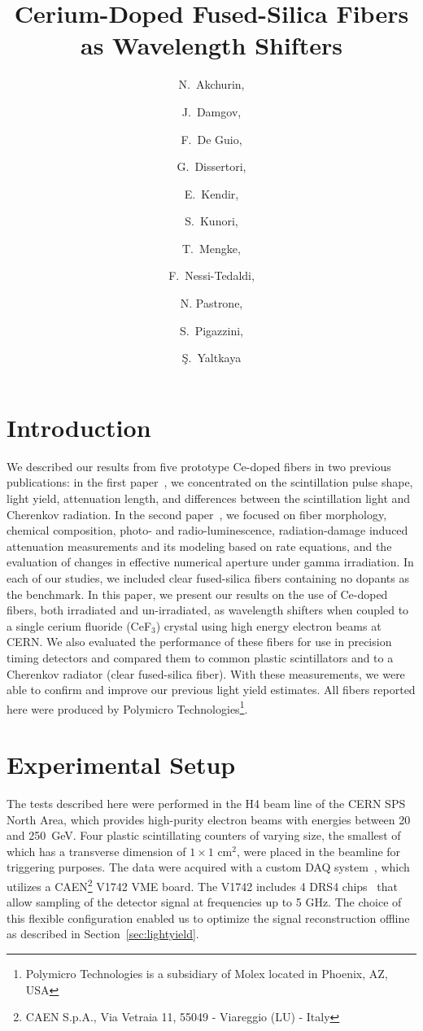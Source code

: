 \documentclass[a4paper,11pt]{article}
\title{\boldmath  Cerium-Doped Fused-Silica Fibers
as Wavelength Shifters}
\author[a,1]{N.~Akchurin,\note{Corresponding author.}}
\author[a]{J.~Damgov,}
\author[a]{F.~De Guio,}
\author[c]{G.~Dissertori,}
\author[b]{E.~Kendir,}
\author[a]{S.~Kunori,}
\author[a]{T.~Mengke,}
\author[c]{F.~Nessi-Tedaldi,}
\author[d]{N. Pastrone,}
\author[c]{S.~Pigazzini,}
\author[b]{\c{S}.~Yaltkaya}
\affiliation[a]{Texas Tech University, Department of Physics and Astronomy,  Lubbock, TX, 79409, USA}
\affiliation[b]{Akdeniz University, Department of Physics, Antalya, 07070, Turkey}
\affiliation[c]{ETH, Z\"urich, Switzerland}
\affiliation[d]{INFN-Torino, Italy}
\begin{document}
\maketitle
\flushbottom

\section{Introduction}
\label{sec:intro}
We described our results from five prototype Ce-doped fibers in two previous publications:  in the first paper~\cite{JINSTPaper}, we concentrated on the scintillation pulse shape, light yield, attenuation length, and differences between the scintillation light and Cherenkov radiation.  In the second paper~\cite{JINSTPaper2}, we focused on fiber morphology, chemical composition, photo- and radio-luminescence, radiation-damage induced attenuation measurements and its modeling based on rate equations, and the evaluation of changes in effective numerical aperture under gamma irradiation.   In each of our studies, we included clear fused-silica fibers containing no dopants  as the benchmark. In this paper, we present our results on the use of Ce-doped fibers, both irradiated and un-irradiated, as wavelength shifters when coupled to a single cerium fluoride (CeF$_3$) crystal using high energy electron beams at CERN.  We also evaluated the performance of these fibers for use in precision timing detectors and compared them to common plastic scintillators and to a Cherenkov radiator (clear fused-silica fiber).  With these measurements, we were able to confirm and improve our previous light yield estimates.  All fibers reported here were produced by Polymicro Technologies\footnote{Polymicro Technologies is a subsidiary of Molex located in Phoenix, AZ, USA}.

\section{Experimental Setup}
\label{sec:experimentalsetup}


The tests described here were performed in the H4 beam line of the CERN SPS North Area, which provides high-purity electron beams with energies between 20 and 250~GeV.  Four plastic scintillating counters of varying size, the smallest of which has a transverse dimension of $1 \times 1$ cm$^2$, were placed in the beamline for triggering purposes.  The data were acquired with a custom DAQ system~\cite{r-MAR}, which utilizes a CAEN\footnote{CAEN S.p.A., Via Vetraia 11, 55049 - Viareggio (LU) - Italy} V1742 VME board. The V1742 includes 4 DRS4 chips~\cite{r-DRS4} that allow sampling of the detector signal at frequencies up to 5 GHz. The choice of this flexible configuration enabled us to optimize the signal reconstruction offline as described in Section~\ref{sec:lightyield}.
\end{document}
